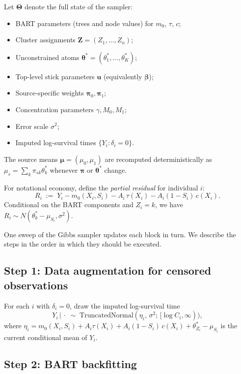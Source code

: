 \documentclass[11pt]{article}
\newcommand{\given}{\,|\,}
\newcommand{\1}{\mathbf{1}}
\begin{document}
Let $\bm{\Theta}$ denote the full state of the sampler:
\begin{itemize}[noitemsep]
\item BART parameters (trees and node values) for $m_0$, $\tau$, $c$;
\item Cluster assignments $\bm{Z} = (Z_1, \ldots, Z_n)$;
\item Unconstrained atoms $\bm{\theta}^* = (\theta_1^*, \ldots, \theta_K^*)$;
\item Top-level stick parameters $\bm{u}$ (equivalently $\bm{\beta}$);
\item Source-specific weights $\bm{\pi}_0, \bm{\pi}_1$;
\item Concentration parameters $\gamma, M_0, M_1$;
\item Error scale $\sigma^2$;
\item Imputed log-survival times $\{Y_i : \delta_i = 0\}$.
\end{itemize}
The source means $\bm{\mu} = (\mu_0, \mu_1)$ are recomputed deterministically as $\mu_s = \sum_k \pi_{sk} \theta_k^*$ whenever $\bm{\pi}$ or $\bm{\theta}^*$ change.

For notational economy, define the \emph{partial residual} for individual $i$:
\begin{equation}
R_i \;:=\; Y_i - m_0(X_i, S_i) - A_i\, \tau(X_i) - A_i(1 - S_i)\, c(X_i).
\label{eq:Ri}
\end{equation}
Conditional on the BART components and $Z_i = k$, we have $R_i \sim N(\theta_k^* - \mu_{S_i}, \sigma^2)$.

One sweep of the Gibbs sampler updates each block in turn. We describe the steps in the order in which they should be executed.

\subsection{Step 1: Data augmentation for censored observations}

For each $i$ with $\delta_i = 0$, draw the imputed log-survival time
\begin{equation}
Y_i \given \cdot \;\sim\; \mathrm{TruncatedNormal}(\eta_i,\, \sigma^2;\, [\log C_i, \infty)),
\end{equation}
where $\eta_i = m_0(X_i, S_i) + A_i \tau(X_i) + A_i(1 - S_i)\, c(X_i) + \theta_{Z_i}^* - \mu_{S_i}$ is the current conditional mean of $Y_i$.

\subsection{Step 2: BART backfitting}
\end{document}
